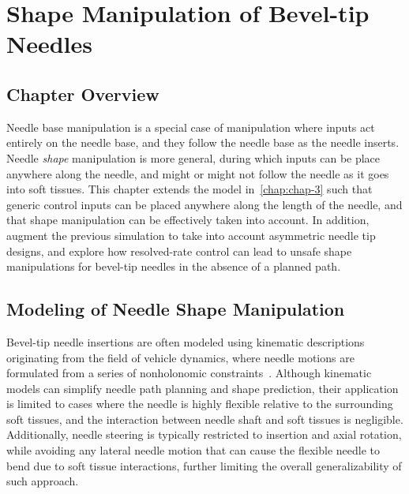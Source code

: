 \chapter{Shape Manipulation of Bevel-tip Needles} \label{chap:chap-4}

\section{Chapter Overview}
\label{sec:chap-4-overview}

Needle base manipulation is a special case of manipulation where inputs act entirely on the needle base, and they follow the needle base as the needle inserts. Needle \textit{shape} manipulation is more general, during which inputs can be place anywhere along the needle, and might or might not follow the needle as it goes into soft tissues. This chapter extends the model in~\cref{chap:chap-3} such that generic control inputs can be placed anywhere along the length of the needle, and that shape manipulation can be effectively taken into account. In addition,  augment the previous simulation to take into account asymmetric needle tip designs, and explore how resolved-rate control can lead to unsafe shape manipulations for bevel-tip needles in the absence of a planned path.

\section{Modeling of Needle Shape Manipulation}
\label{sec:chap-4-model}

Bevel-tip needle insertions are often modeled using kinematic descriptions originating from the field of vehicle dynamics, where needle motions are formulated from a series of nonholonomic constraints~\parencite{parkDiffusionBasedMotionPlanning2005,websterNonholonomicModelingNeedle2006,alterovitzMotionPlanningUncertainty2008}. Although kinematic models can simplify needle path planning and shape prediction, their application is limited to cases where the needle is highly flexible relative to the surrounding soft tissues, and the interaction between needle shaft and soft tissues is negligible. Additionally, needle steering is typically restricted to insertion and axial rotation, while avoiding any lateral needle motion that can cause the flexible needle to bend due to soft tissue interactions, further limiting the overall generalizability of such approach.

